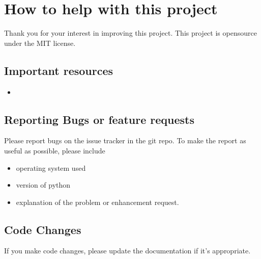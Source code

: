 \documentclass[letterpaper,10pt,english]{sphinxmanual}
\begin{document}
\sphinxstepscope


\chapter{How to help with this project}
\label{\detokenize{Contributing:how-to-help-with-this-project}}\label{\detokenize{Contributing::doc}}
\sphinxAtStartPar
Thank you for your interest in improving this project.
This project is open\sphinxhyphen{}source under the MIT license.


\section{Important resources}
\label{\detokenize{Contributing:important-resources}}\begin{itemize}
\item {} 
\sphinxAtStartPar
{}

\end{itemize}


\section{Reporting Bugs or feature requests}
\label{\detokenize{Contributing:reporting-bugs-or-feature-requests}}
\sphinxAtStartPar
Please report bugs on the issue tracker in the git repo.
To make the report as useful as possible, please include
\begin{itemize}
\item {} 
\sphinxAtStartPar
operating system used

\item {} 
\sphinxAtStartPar
version of python

\item {} 
\sphinxAtStartPar
explanation of the problem or enhancement request.

\end{itemize}


\section{Code Changes}
\label{\detokenize{Contributing:code-changes}}
\sphinxAtStartPar
If you make code changes, please update the documentation if
it’s appropriate.
\begin{quote}
\end{quote}

\sphinxstepscope
\end{document}
